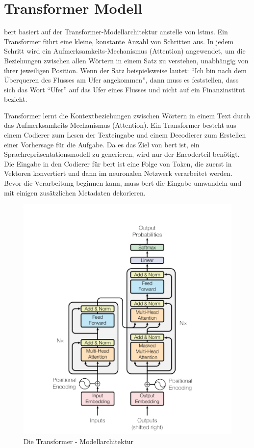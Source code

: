 \documentclass[
        ngerman,
        paper=a4,
        numbers=noendperiod,
]{scrreprt}
\begin{document}
\section{Transformer Modell}

\ac{bert} basiert auf der Transformer-Modellarchitektur anstelle von \ac{lstm}s. Ein Transformer führt eine kleine, konstante Anzahl von Schritten aus. In jedem Schritt wird ein Aufmerksamkeits-Mechanismus (Attention) angewendet, um die Beziehungen zwischen allen Wörtern in einem Satz zu verstehen, unabhängig von ihrer jeweiligen Position. Wenn der Satz beispielsweise lautet: \enquote{Ich bin nach dem Überqueren des Flusses am Ufer angekommen}, dann muss es feststellen, dass sich das Wort \enquote{Ufer} auf das Ufer eines Flusses und nicht auf ein Finanzinstitut bezieht.

Transformer lernt die Kontextbeziehungen zwischen Wörtern in einem Text durch das Aufmerksamkeits-Mechanismus (Attention). Ein Transformer besteht aus einem Codierer zum Lesen der Texteingabe und einem Decodierer zum Erstellen einer Vorhersage für die Aufgabe. Da es das Ziel von \ac{bert} ist, ein Sprachrepräsentationsmodell zu generieren, wird nur der Encoderteil benötigt. Die Eingabe in den Codierer für \ac{bert} ist eine Folge von Token, die zuerst in Vektoren konvertiert und dann im neuronalen Netzwerk verarbeitet werden. Bevor die Verarbeitung beginnen kann, muss \ac{bert} die Eingabe umwandeln und mit einigen zusätzlichen Metadaten dekorieren. 


\begin{figure}[H]
    \centering\includegraphics[width=0.6\linewidth]{images/trans.png}
    \caption[Die Transformer - Modellarchitektur]{Die Transformer - Modellarchitektur \citep{VaswaniAttentionNeed}}
    \label{fig:trans}
\end{figure}
\end{document}

